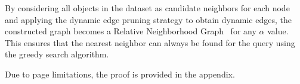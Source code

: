 \vspace*{-0.5em}
\begin{lemma}
\label{lemma:drng-nearest-neighbor}
By considering all objects in the dataset as candidate neighbors for each node and applying the dynamic edge pruning strategy to obtain dynamic edges, the constructed graph becomes a Relative Neighborhood Graph~\cite{fu2019fast} for any $\alpha$ value. This ensures that the nearest neighbor can always be found for the query using the greedy search algorithm. 
\end{lemma}
\vspace*{-0.5em}
Due to page limitations, the proof is provided in the appendix.






